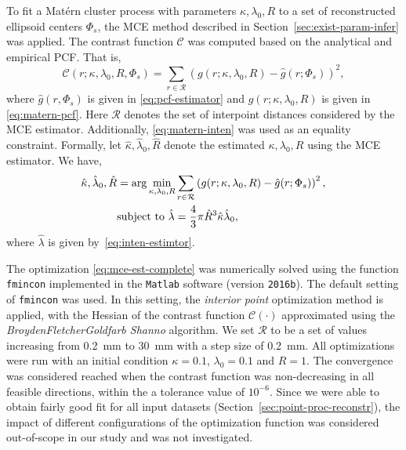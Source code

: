 \documentclass[journal]{IEEEtran}
\begin{document}
To fit a Mat\'ern cluster process with parameters
$\kappa, \lambda_0, R$ to a set of reconstructed ellipsoid centers
$\Phi_s$, the MCE method described in
Section~\ref{sec:exist-param-infer} was applied. The contrast function
$\mathcal{C}$ was computed based on the analytical and empirical
PCF. That is,
\begin{equation}
  \label{eq:matern-contrast}
  \mathcal{C}(r; \kappa, \lambda_0, R, \Phi_s) =
  \sum_{r \in \mathcal{R}} (g(r; \kappa, \lambda_0, R) -
  \hat{g}(r; \Phi_s))^2,
\end{equation}
where $\hat{g}(r, \Phi_s)$ is given in \eqref{eq:pcf-estimator} and
$g(r; \kappa, \lambda_0, R)$ is given in \eqref{eq:matern-pcf}. Here
$\mathcal{R}$ denotes the set of interpoint distances considered by
the MCE estimator. Additionally, \eqref{eq:matern-inten} was used as
an equality constraint. %
Formally, let $\hat{\kappa}, \hat{\lambda}_0, \hat{R}$ denote the
estimated $\kappa, \lambda_0, R$ using the MCE estimator.  We have,
\begin{equation}
  \label{eq:mce-est-complete}
  \begin{aligned}
    \hat{\kappa}, \hat{\lambda}_0, \hat{R} & = \arg \min_{\kappa,
      \lambda_0, R} \sum_{r \in \mathcal{R}} \left( g(r; \kappa,
      \lambda_0, R)
      - \hat{g}(r; \Phi_s) \right)^2, \\
    & \textnormal{subject to } \hat{\lambda} = \frac{4}{3}\pi
    \hat{R}^3\hat{\kappa} \hat{\lambda}_0,
  \end{aligned}
\end{equation}
where $\hat{\lambda}$ is given by~\eqref{eq:inten-estimtor}.

The optimization \eqref{eq:mce-est-complete} was numerically solved
using the function \texttt{fmincon} implemented in the \texttt{Matlab}
software (version \texttt{2016b}). The default setting of
\texttt{fmincon} was used. In this setting, the \textit{interior
  point} optimization method is applied, with the Hessian of the
contrast function $\mathcal{C}(\cdot)$ approximated using the
\textit{Broyden\textendash Fletcher\textendash Goldfarb\textendash
  Shanno} algorithm. We set $\mathcal{R}$ to be a set of values
increasing from \SI{0.2}{\mm} to \SI{30}{\mm} with a step size of
\SI{0.2}{\mm}. All optimizations were run with an initial condition
$\kappa = 0.1$, $\lambda_0 = 0.1$ and $R = 1$. The convergence was
considered reached when the contrast function was non-decreasing in
all feasible directions, within the a tolerance value of
$10^{-6}$. Since we were able to obtain fairly good fit for all input
datasets (Section~\ref{sec:point-proc-reconstr}), the impact of
different configurations of the optimization function was considered
out-of-scope in our study and was not investigated.
\end{document}
